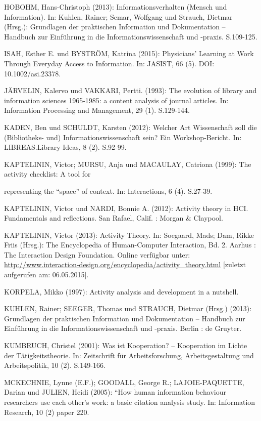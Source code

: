 \documentclass[a4paper,
fontsize=11pt,
oneside,
numbers=noperiodatend,
parskip=half-,
bibliography=totoc,
final
]{scrartcl}
\begin{document}
HOBOHM, Hans-Christoph (2013): Informationsverhalten (Mensch und
Information). In: Kuhlen, Rainer; Semar, Wolfgang und Strauch, Dietmar
(Hrsg.): Grundlagen der praktischen Information und Dokumentation --
Handbuch zur Einführung in die Informationswissenschaft und -praxis.
S.109-125.

ISAH, Esther E. und BYSTRÖM, Katrina (2015): Physicians' Learning at
Work Through Everyday Access to Information. In: JASIST, 66 (5). DOI:
10.1002/asi.23378.

JÄRVELIN, Kalervo und VAKKARI, Pertti. (1993): The evolution of library
and information sciences 1965-1985: a content analysis of journal
articles. In: Information Processing and Management, 29 (1). S.129-144.

KADEN, Ben und SCHULDT, Karsten (2012): Welcher Art Wissenschaft soll
die (Bibliotheks- und) Informationswissenschaft sein? Ein
Workshop-Bericht. In: LIBREAS.Library Ideas, 8 (2). S.92-99.

KAPTELININ, Victor; MURSU, Anja und MACAULAY, Catriona (1999): The
activity checklist: A tool for

representing the \enquote{space} of context. In: Interactions, 6 (4).
S.27-39.

KAPTELININ, Victor und NARDI, Bonnie A. (2012): Activity theory in HCI.
Fundamentals and reflections. San Rafael, Calif. : Morgan \& Claypool.

KAPTELININ, Victor (2013): Activity Theory. In: Soegaard, Mads; Dam,
Rikke Friis (Hrsg.): The Encyclopedia of Human-Computer Interaction, Bd.
2. Aarhus : The Interaction Design Foundation. Online verfügbar unter:
\url{http://www.interaction-design.org/encyclopedia/activity_theory.html}
{[}zuletzt aufgerufen am: 06.05.2015{]}.

KORPELA, Mikko (1997): Activity analysis and development in a nutshell.

KUHLEN, Rainer; SEEGER, Thomas und STRAUCH, Dietmar (Hrsg.) (2013):
Grundlagen der praktischen Information und Dokumentation -- Handbuch zur
Einführung in die Informationswissenschaft und -praxis. Berlin : de
Gruyter.

KUMBRUCH, Christel (2001): Was ist Kooperation? -- Kooperation im Lichte
der Tätigkeitstheorie. In: Zeitschrift für Arbeitsforschung,
Arbeitsgestaltung und Arbeitspolitik, 10 (2). S.149-166.

MCKECHNIE, Lynne (E.F.); GOODALL, George R.; LAJOIE-PAQUETTE, Darian und
JULIEN, Heidi (2005): ``How human information behaviour researchers use
each other's work: a basic citation analysis study. In: Information
Research, 10 (2) paper 220.
\end{document}
